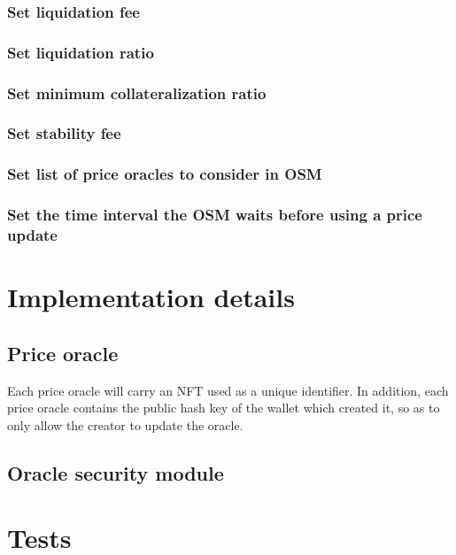 \documentclass{article} %
\begin{document}
\subsubsection{Set liquidation fee}

\subsubsection{Set liquidation ratio}

\subsubsection{Set minimum collateralization ratio}

\subsubsection{Set stability fee}

\subsubsection{Set list of price oracles to consider in OSM}

\subsubsection{Set the time interval the OSM waits before using a price update}


\section{Implementation details}


\subsection{Price oracle}

Each price oracle will carry an NFT used as a unique identifier.
In addition, each price oracle contains the public hash key of the wallet which
created it, so as to only allow the creator to update the oracle.

\subsection{Oracle security module}

\section{Tests}


% 
\end{document}
